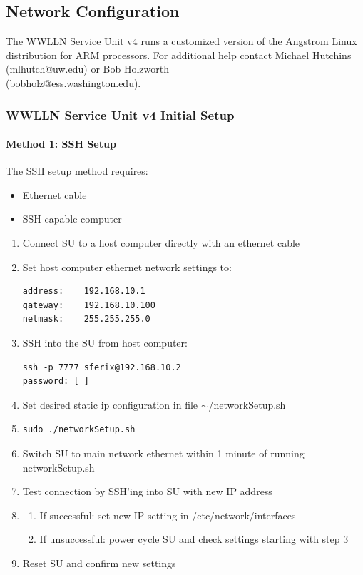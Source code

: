 \clearpage

\subsection{Network Configuration}
\label{su:subsection:suSoftware}

The WWLLN Service Unit v4 runs a customized version of the Angstrom Linux distribution for ARM processors.
For additional help contact Michael Hutchins (\mbox{mlhutch@uw.edu}) or Bob Holzworth 
\\
(\mbox{bobholz@ess.washington.edu}).

\subsubsection{WWLLN Service Unit v4 Initial Setup}

\paragraph{Method 1: SSH Setup}
The SSH setup method requires:
\begin{itemize}
\item{Ethernet cable}
\item{SSH capable computer}
\end{itemize}

\begin{enumerate}
\item{Connect SU to a host computer directly with an ethernet cable}
\item{Set host computer ethernet network settings to:
\begin{verbatim}
address:	192.168.10.1
gateway:	192.168.10.100
netmask:	255.255.255.0
\end{verbatim}}
\item{SSH into the SU from host computer:
\begin{verbatim}
ssh -p 7777 sferix@192.168.10.2
password: [	]
\end{verbatim}}
\item{Set desired static ip configuration in file $\sim$/networkSetup.sh}
\item{\begin{verbatim}
sudo ./networkSetup.sh
\end{verbatim}}
\item{Switch SU to main network ethernet within 1 minute of running networkSetup.sh}
\item{Test connection by SSH'ing into SU with new IP address}
\item{
\begin{enumerate}
\item{If successful: set new IP setting in /etc/network/interfaces}
\item{If unsuccessful: power cycle SU and check settings starting with step 3}
\end{enumerate}}
\item{Reset SU and confirm new settings}
\end{enumerate}

